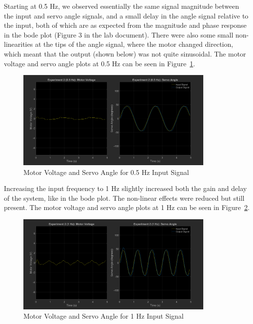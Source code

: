\documentclass[12pt]{article}
\begin{document}
Starting at 0.5 Hz, we observed essentially the same signal magnitude between the input and servo angle signals, and a small delay in the angle signal relative to the input, both of which are as expected from the magnitude and phase response in the bode plot (Figure 3 in the lab document). There were also some small non-linearities at the tips of the angle signal, where the motor changed direction, which meant that the output (shown below) was not quite sinusoidal. The motor voltage and servo angle plots at 0.5 Hz can be seen in Figure~\ref{fig:exp2_0.5}.
\begin{figure}[h!]
    \centering
    \includegraphics[width=0.87\textwidth]{exp2_0.5}
    \caption{\label{fig:exp2_0.5}Motor Voltage and Servo Angle for 0.5 Hz Input Signal}
\end{figure}

Increasing the input frequency to 1 Hz slightly increased both the gain and delay of the system, like in the bode plot. The non-linear effects were reduced but still present. The motor voltage and servo angle plots at 1 Hz can be seen in Figure~\ref{fig:exp2_1}.
\begin{figure}[h!]
    \centering
    \includegraphics[width=0.87\textwidth]{exp2_1}
    \caption{\label{fig:exp2_1}Motor Voltage and Servo Angle for 1 Hz Input Signal}
\end{figure}
\end{document}

